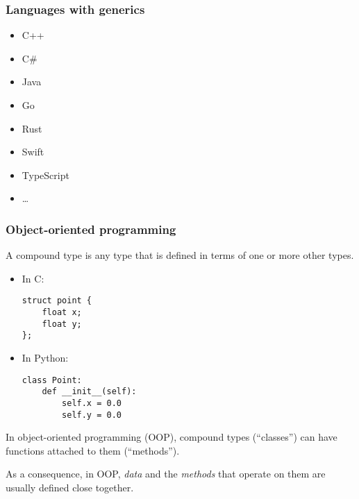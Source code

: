 \documentclass[12pt]{article}
\begin{document}
\subsubsection{Languages with generics}

\begin{itemize}
    \item C++
    \item C\#
    \item Java
    \item Go
    \item Rust
    \item Swift
    \item TypeScript
    \item \ldots
\end{itemize}




\subsubsection{Object-oriented programming}

A compound type is any type that is defined in terms of one or more other types.

\begin{itemize}
    \item In C:
\begin{verbatim}
struct point {
    float x;
    float y;
};
\end{verbatim}

    \item In Python:
\begin{verbatim}
class Point:
    def __init__(self):
        self.x = 0.0
        self.y = 0.0
\end{verbatim}
\end{itemize}

In object-oriented programming (OOP), compound types (``classes'')
can have functions attached to them (``methods'').

As a consequence, in OOP, \emph{data} and the \emph{methods} that operate on them are usually defined close together.
\end{document}
